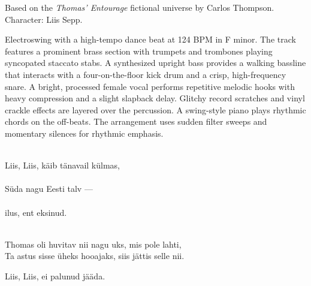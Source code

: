 

\begin{notes}
Based on the \emph{Thomas’ Entourage} fictional universe by Carlos Thompson.\\
Character: Liis Sepp.\\
\end{notes}

\begin{style}
Electroswing with a high-tempo dance beat at 124 BPM in F minor. %
The track features a prominent brass section with trumpets and trombones playing syncopated staccato stabs. %
A synthesized upright bass provides a walking bassline that interacts with a four-on-the-floor kick drum and a crisp, high-frequency snare. %
A bright, processed female vocal performs repetitive melodic hooks with heavy compression and a slight slapback delay. %
Glitchy record scratches and vinyl crackle effects are layered over the percussion. %
A swing-style piano plays rhythmic chords on the off-beats. %
The arrangement uses sudden filter sweeps and momentary silences for rhythmic emphasis.
\end{style}

\begin{lyrics}
\\
 Liis, Liis, käib tänavail külmas,\\
\\
Süda nagu Eesti talv —\\
\\
ilus, ent eksinud.

\\
Thomas oli huvitav nii nagu uks, mis pole lahti,\\
Ta astus sisse üheks hooajaks, siis jättis selle nii.

Liis, Liis, ei palunud jääda.
\end{lyrics}

